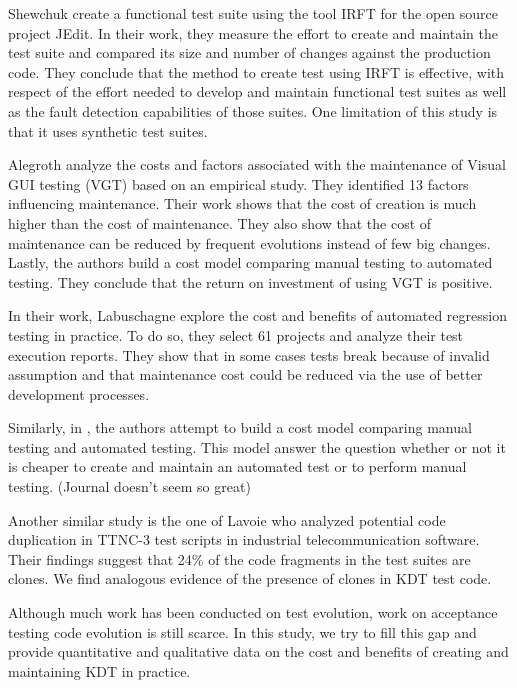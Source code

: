 Shewchuk\etal\cite{Shewchuk2010} create a functional test suite using the tool IRFT for the open source project JEdit. In their work, they measure the effort to create and maintain the test suite and compared its size and number of changes against the production code. They conclude that the method to create test using IRFT is effective, with respect of the effort needed to develop and maintain functional test suites as well as the fault detection capabilities of those suites. One limitation of this study is that it uses synthetic test suites.

Alegroth\etal\cite{Alegroth2013, Alegroth2016} analyze the costs and factors associated with the maintenance of Visual GUI testing (VGT) based on an empirical study. They identified 13 factors influencing maintenance. Their work shows that the cost of creation is much higher than the cost of maintenance. They also show that the cost of maintenance can be reduced by frequent evolutions instead of few big changes. Lastly, the authors build a cost model comparing manual testing to automated testing. They conclude that the return on investment of using VGT is positive.

In their work, Labuschagne\etal\cite{Labuschagne2017} explore the cost and benefits of automated regression testing in practice. To do so, they select 61 projects and analyze their test execution reports. They show that in some cases tests break because of invalid assumption and that maintenance cost could be reduced via the use of better development processes.

Similarly, in \cite{Kan2013}, the authors attempt to build a cost model comparing manual testing and automated testing. This model answer the question whether or not it is cheaper to create and maintain an automated test or to perform manual testing. (Journal doesn't seem so great)

Another similar study is the one of Lavoie\etal\cite{Lavoie2017} who analyzed potential code duplication in TTNC-3 test scripts in industrial telecommunication software. Their findings suggest that 24\% of the code fragments in the test suites are clones. We find analogous evidence of the presence of clones in KDT test code.

Although much work has been conducted on test evolution, work on acceptance testing code evolution is still scarce. In this study, we try to fill this gap and provide quantitative and qualitative data on the cost and benefits of creating and maintaining KDT in practice.


